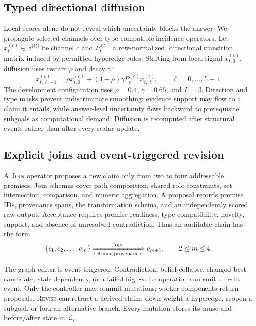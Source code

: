 \subsection{Typed directional diffusion}
Local scores alone do not reveal which uncertainty blocks the answer. We propagate selected channels over type-compatible incidence operators. Let $x_t^{(c)}\in\mathbb{R}^{|V_t|}$ be channel $c$ and $P_t^{(c)}$ a row-normalized, directional transition matrix induced by permitted hyperedge roles. Starting from local signal $x_{t,0}^{(c)}$, diffusion uses restart $\rho$ and decay $\gamma$:
\begin{equation}
x_{t,\ell+1}^{(c)}=\rho x_{t,0}^{(c)} +(1-\rho)\gamma P_t^{(c)}x_{t,\ell}^{(c)},\qquad \ell=0,\ldots,L-1.
\label{eq:diffusion}
\end{equation}
The development configuration uses $\rho=0.4$, $\gamma=0.65$, and $L=3$. Direction and type masks prevent indiscriminate smoothing: evidence support may flow to a claim it entails, while answer-level uncertainty flows backward to prerequisite subgoals as computational demand. Diffusion is recomputed after structural events rather than after every scalar update.

\subsection{Explicit joins and event-triggered revision}
A \textsc{Join} operator proposes a new claim only from two to four addressable premises. Join schemas cover path composition, shared-role constraints, set intersection, comparison, and numeric aggregation. A proposal records premise IDs, provenance spans, the transformation schema, and an independently scored raw output. Acceptance requires premise readiness, type compatibility, novelty, support, and absence of unresolved contradiction. Thus an auditable chain has the form
\begin{equation}
\{c_1,c_2,\ldots,c_m\}\xRightarrow[\text{schema},\,\text{provenance}]{\textsc{Join}}c_{m+1},\qquad 2\leq m\leq4.
\end{equation}

The graph editor is event-triggered. Contradiction, belief collapse, changed best candidate, stale dependency, or a failed high-value operation can emit an edit event. Only the controller may commit mutations; worker components return proposals. \textsc{Revise} can retract a derived claim, down-weight a hyperedge, reopen a subgoal, or fork an alternative branch. Every mutation stores its cause and before/after state in $\mathcal{L}_t$.

